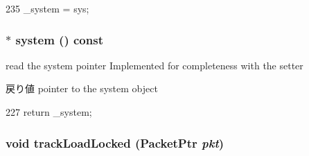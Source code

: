 \begin{DoxyCode}
235 { _system = sys; }
\end{DoxyCode}
\hypertarget{classAbstractMemory_a83984c42bc765168929779ed9a37ebe8}{
\subsubsection[{system}]{$\ast$ system () const}}
\label{classAbstractMemory_a83984c42bc765168929779ed9a37ebe8}
read the system pointer Implemented for completeness with the setter \begin{DoxyReturn}{戻り値}
pointer to the system object 
\end{DoxyReturn}



\begin{DoxyCode}
227 { return _system; }
\end{DoxyCode}
\hypertarget{classAbstractMemory_ad317aec11d97a72993e653755fa1c003}{
\subsubsection[{trackLoadLocked}]{\setlength{\rightskip}{0pt plus 5cm}void trackLoadLocked ({\bf PacketPtr} {\em pkt})}}
\label{classAbstractMemory_ad317aec11d97a72993e653755fa1c003}



